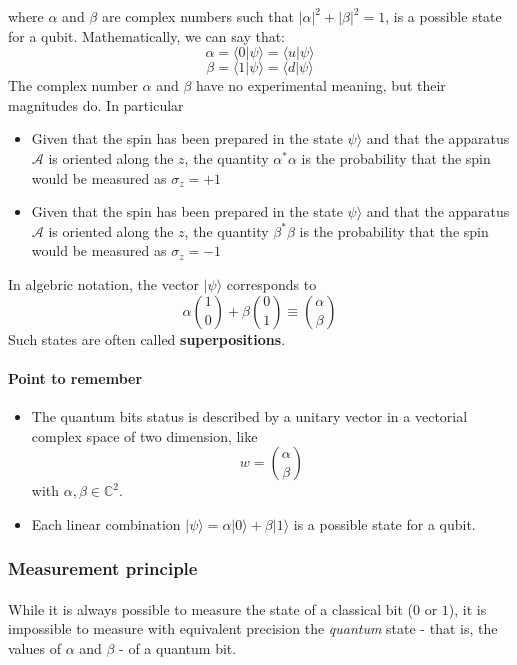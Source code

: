 \documentclass[a4paper,10pt]{article}
\begin{document}
where $\alpha$ and $\beta$ are complex numbers such that $|\alpha|^2 + |\beta|^2 = 1$, is a possible state for a qubit. Mathematically, we can say that:
$$\alpha = \langle 0|\psi\rangle = \langle u|\psi\rangle$$
$$\beta = \langle 1|\psi\rangle = \langle d|\psi\rangle$$
The complex number $\alpha$ and $\beta$ have no experimental meaning, but their magnitudes do. In particular
\begin{itemize}
    \item Given that the spin has been prepared in the state $\psi\rangle$ and that the apparatus $\mathcal{A}$ is oriented along the $z$, the quantity $\alpha^*\alpha$ is the probability that the spin would be measured as $\sigma_z = +1$
    \item Given that the spin has been prepared in the state $\psi\rangle$ and that the apparatus $\mathcal{A}$ is oriented along the $z$, the quantity $\beta^*\beta$ is the probability that the spin would be measured as $\sigma_z = -1$
\end{itemize}

In algebric notation, the vector $|\psi\rangle$ corresponds to
$$\alpha\binom{1}{0} + \beta\binom{0}{1} \equiv \binom{\alpha}{\beta}$$
Such states are often called \textbf{superpositions}.

\paragraph{Point to remember}
\begin{itemize}
    \item The quantum bits status is described by a unitary vector in a vectorial complex space of two dimension, like
    $$w = \binom{\alpha}{\beta}$$
    with ${\alpha}, {\beta} \in {\mathbb{C}}^2$.
    \item Each linear combination $|\psi\rangle = \alpha|0\rangle + \beta|1\rangle$ is a possible state for a qubit. 
\end{itemize}

\subsubsection{Measurement principle}

\paragraph{} While it is always possible to measure the state of a classical bit ($0$ or $1$), it is impossible to measure with equivalent precision the \textit{quantum} state - that is, the values of $\alpha$ and $\beta$ - of a quantum bit. 
\end{document}
